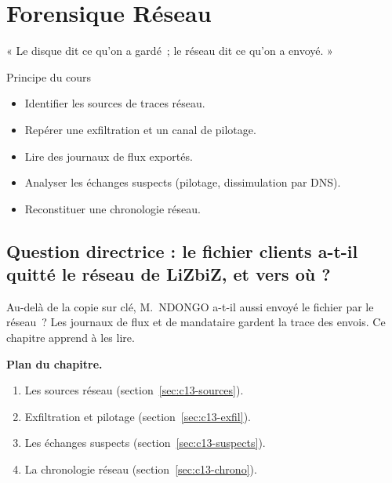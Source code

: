 
\chapter{Forensique Réseau}
\label{chap:reseau}

\epigraph{%
    « Le disque dit ce qu'on a gardé~; le réseau dit ce qu'on a envoyé. »%
}{Principe du cours}


\begin{boxobjectifs}
\begin{itemize}
    \item Identifier les sources de traces réseau.
    \item Repérer une exfiltration et un canal de pilotage.
    \item Lire des journaux de flux exportés.
    \item Analyser les échanges suspects (pilotage, dissimulation par DNS).
    \item Reconstituer une chronologie réseau.
\end{itemize}
\end{boxobjectifs}

\bigskip

\section*{Question directrice : le fichier clients a-t-il quitté le réseau de LiZbiZ, et vers où ?}

Au-delà de la copie sur clé, M.~NDONGO a-t-il aussi envoyé le fichier par le
réseau~? Les journaux de flux et de mandataire gardent la trace des envois.
Ce chapitre apprend à les lire.

\medskip
\textbf{Plan du chapitre.}
\begin{enumerate}
    \item Les sources réseau (section~\ref{sec:c13-sources}).
    \item Exfiltration et pilotage (section~\ref{sec:c13-exfil}).
    \item Les échanges suspects (section~\ref{sec:c13-suspects}).
    \item La chronologie réseau (section~\ref{sec:c13-chrono}).
\end{enumerate}

